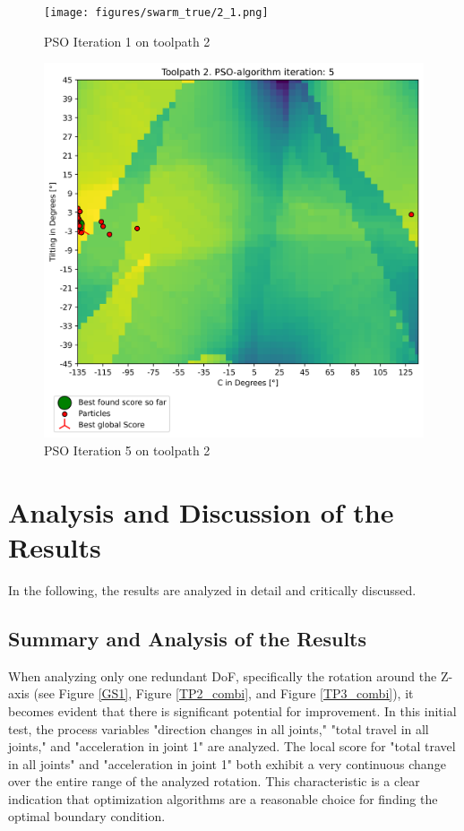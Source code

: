 \begin{figure}[H]	
	\centering
	\begin{minipage}{0.5\textwidth}
		\texttt{[image: figures/swarm\_true/2\_1.png]}
		\caption{PSO Iteration 1 on toolpath 2}
		\label{tp2_0}
	\end{minipage}\hfill
	\begin{minipage}{0.5\textwidth}
		\includegraphics[width=\textwidth]{figures/swarm_true/2_5.png}
		\caption{PSO Iteration 5 on toolpath 2}
		\label{tp2_5}
	\end{minipage}\par
\end{figure}



\newpage
\section{Analysis and Discussion of the Results}%
In the following, the results are analyzed in detail and critically discussed.

\subsection{Summary and Analysis of the Results}
When analyzing only one redundant \acrshort{DoF}, specifically the rotation around the Z-axis (see Figure \ref{GS1}, Figure \ref{TP2_combi}, and Figure \ref{TP3_combi}), it becomes evident that there is significant potential for improvement. In this initial test, the process variables "direction changes in all joints," "total travel in all joints," and "acceleration in joint 1" are analyzed. The local score for "total travel in all joints" and "acceleration in joint 1" both exhibit a very continuous change over the entire range of the analyzed rotation. This characteristic is a clear indication that optimization algorithms are a reasonable choice for finding the optimal boundary condition.

